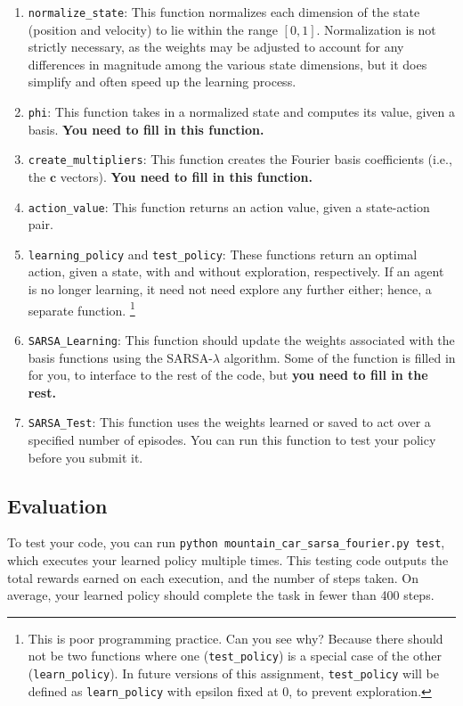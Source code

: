\documentclass{article}
\begin{document}
\begin{enumerate}
\item \texttt{normalize\_state}: This function normalizes each
  dimension of the state (position and velocity) to lie within the
  range $[0,1]$. Normalization is not strictly necessary, as the
  weights may be adjusted to account for any differences in magnitude
  among the various state dimensions, but it does simplify and often
  speed up the learning process.
  
\item \texttt{phi}: This function takes in a normalized state and
  computes its value, given a basis. \textbf{You need to fill in this
    function.}
  
\item \texttt{create\_multipliers}: This function creates the Fourier
  basis coefficients (i.e., the $\bm{c}$ vectors). \textbf{You need to
    fill in this function.}
  
\item \texttt{action\_value}: This function returns an action value,
  given a state-action pair.
  
\item \texttt{learning\_policy} and \texttt{test\_policy}: These
  functions return an optimal action, given a state, with and without
  exploration, respectively.  If an agent is no longer learning, it
  need not need explore any further either; hence, a separate function.%
\footnote{This is poor programming practice.  Can you see why?  Because there should not
  be two functions where one (\texttt{test\_policy}) is a special case of the other (\texttt{learn\_policy}).
  In future versions of this assignment, \texttt{test\_policy} will be defined as \texttt{learn\_policy} with epsilon fixed at 0,
  to prevent exploration.}
  
\item \texttt{SARSA\_Learning}: This function should update the
  weights associated with the basis functions using the
  SARSA-$\lambda$ algorithm.  Some of the function is filled in for
  you, to interface to the rest of the code, but \textbf{you need to
    fill in the rest.}

\item \texttt{SARSA\_Test}: This function uses the weights learned or
  saved to act over a specified number of episodes.  You can run this
  function to test your policy before you submit it.
\end{enumerate}


\subsection{Evaluation}
To test your code, you can run \texttt{python
  mountain\_car\_sarsa\_fourier.py test}, which executes your learned
policy multiple times.  This testing code outputs the total rewards
earned on each execution, and the number of steps taken.  On average,
your learned policy should complete the task in fewer than 400 steps.
\end{document}

